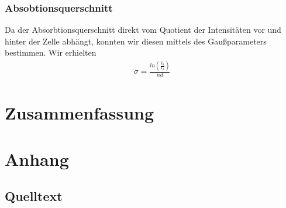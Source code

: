 \documentclass[12pt]{article}
\begin{document}
\subsubsection{Absobtionsquerschnitt}
Da der Absorbtionsquerschnitt direkt vom Quotient der Intensitäten vor und hinter der Zelle abhängt, konnten wir diesen mittels des Gaußparameters bestimmen.
Wir erhielten
\begin{align*}
 \sigma = \frac{ln \left( \frac{I_0}{I_d} \right) }{nd}
\end{align*}
\section{Zusammenfassung}
\section{Anhang}


\subsection{Quelltext}

%
\end{document}
